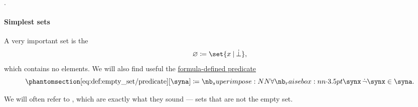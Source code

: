 \begin{definition}\label{def:subset_ordering}
  .
\end{definition}

\paragraph{Simplest sets}

\begin{definition}\label{def:empty_set}
  A very important set is the 
  \begin{equation*}
    \varnothing \coloneqq \set{ x \given \synbot },
  \end{equation*}
  which contains no elements. We will also find useful the \hyperref[con:formula_defined_predicate]{formula-defined predicate}
  \begin{equation*}\taglabel[\op{IsEmpty}]{eq:def:empty_set/predicate}
    \ref{eq:def:empty_set/predicate}[\syna] \coloneqq \qforall \synx \synneg \synx \in \syna.
  \end{equation*}

  We will often refer to , which are exactly what they sound --- sets that are not the empty set.
\end{definition}

